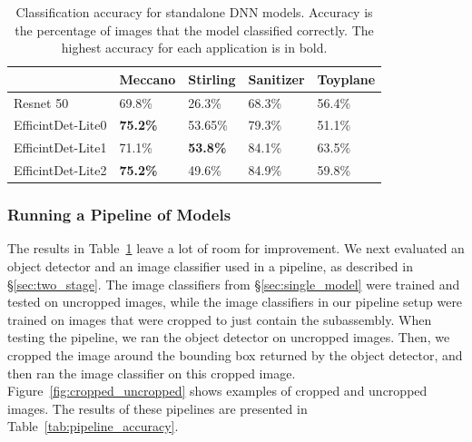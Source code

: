 \begin{table}
\begin{tabular}{|l||l|l|l|l|}
\hline
  & Meccano & Stirling & Sanitizer & Toyplane\\
  \hline
  \hline
  Resnet 50 & 69.8\% & 26.3\% & 68.3\% & 56.4\%\\
  EfficintDet-Lite0 & \textbf{75.2\%} & 53.65\% & 79.3\% & 51.1\%\\
  EfficintDet-Lite1 & 71.1\% & \textbf{53.8\%} & 84.1\% & 63.5\%\\
  EfficintDet-Lite2 & \textbf{75.2\%} & 49.6\% & 84.9\% & 59.8\%\\
  \hline
\end{tabular}
  \caption{
    Classification accuracy for standalone DNN models.
    Accuracy is the percentage of images that the model classified correctly.
    The highest accuracy for each application is in bold.
  }\label{tab:standalone_accuracy}
\end{table}

\subsubsection{Running a Pipeline of Models}

The results in Table~\ref{tab:standalone_accuracy} leave a lot of room for
improvement.
We next evaluated an object detector and an image classifier used in a pipeline,
as described in \S\ref{sec:two_stage}.
The image classifiers from \S\ref{sec:single_model} were trained and tested
on uncropped images, while the image classifiers in our pipeline setup were
trained on images that were cropped to just contain the subassembly.
When testing the pipeline, we ran the object detector on uncropped images.
Then, we cropped the image around the bounding box returned by the object
detector, and then ran the image classifier on this cropped image.
Figure~\ref{fig:cropped_uncropped} shows examples of cropped and uncropped
images.
The results of these pipelines are presented in
Table~\ref{tab:pipeline_accuracy}.

